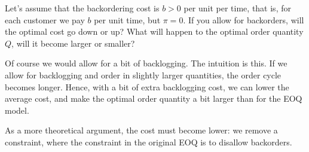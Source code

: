 \begin{exercise}
Let's  assume that the backordering cost is $b>0$ per unit per time, that is, for each customer we pay $b$ per unit time, but $\pi=0$.  If you allow for backorders, will the optimal cost go down or up?  What   will happen to the optimal order quantity $Q$, will it become larger or smaller? 
  \begin{solution}
  Of course we would allow for a bit of backlogging. The
  intuition is this. If we allow for backlogging and order in slightly
  larger quantities, the order cycle becomes longer. Hence, with a bit
  of extra backlogging cost, we can lower the average cost, and make the optimal order quantity a bit larger than for the EOQ model.

As a more theoretical argument,  the cost must become lower: we remove a constraint, where the constraint in the original EOQ is to disallow backorders. 
  \end{solution}
\end{exercise}


